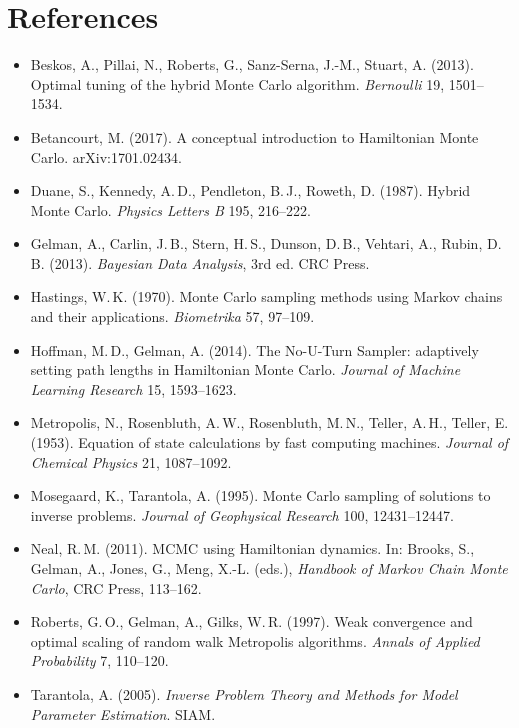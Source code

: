 \documentclass[11pt,a4paper]{article}
\begin{document}
\section*{References}
\begin{itemize}[leftmargin=*,label={}]
\item Beskos, A., Pillai, N., Roberts, G., Sanz-Serna, J.-M., Stuart, A. (2013). Optimal tuning of the hybrid
  Monte Carlo algorithm. \emph{Bernoulli} 19, 1501--1534.
\item Betancourt, M. (2017). A conceptual introduction to Hamiltonian Monte Carlo. arXiv:1701.02434.
\item Duane, S., Kennedy, A.\,D., Pendleton, B.\,J., Roweth, D. (1987). Hybrid Monte Carlo. \emph{Physics
  Letters B} 195, 216--222.
\item Gelman, A., Carlin, J.\,B., Stern, H.\,S., Dunson, D.\,B., Vehtari, A., Rubin, D.\,B. (2013).
  \emph{Bayesian Data Analysis}, 3rd ed. CRC Press.
\item Hastings, W.\,K. (1970). Monte Carlo sampling methods using Markov chains and their applications.
  \emph{Biometrika} 57, 97--109.
\item Hoffman, M.\,D., Gelman, A. (2014). The No-U-Turn Sampler: adaptively setting path lengths in Hamiltonian
  Monte Carlo. \emph{Journal of Machine Learning Research} 15, 1593--1623.
\item Metropolis, N., Rosenbluth, A.\,W., Rosenbluth, M.\,N., Teller, A.\,H., Teller, E. (1953). Equation of
  state calculations by fast computing machines. \emph{Journal of Chemical Physics} 21, 1087--1092.
\item Mosegaard, K., Tarantola, A. (1995). Monte Carlo sampling of solutions to inverse problems.
  \emph{Journal of Geophysical Research} 100, 12431--12447.
\item Neal, R.\,M. (2011). MCMC using Hamiltonian dynamics. In: Brooks, S., Gelman, A., Jones, G., Meng, X.-L.
  (eds.), \emph{Handbook of Markov Chain Monte Carlo}, CRC Press, 113--162.
\item Roberts, G.\,O., Gelman, A., Gilks, W.\,R. (1997). Weak convergence and optimal scaling of random walk
  Metropolis algorithms. \emph{Annals of Applied Probability} 7, 110--120.
\item Tarantola, A. (2005). \emph{Inverse Problem Theory and Methods for Model Parameter Estimation}. SIAM.
\end{itemize}
\end{document}
